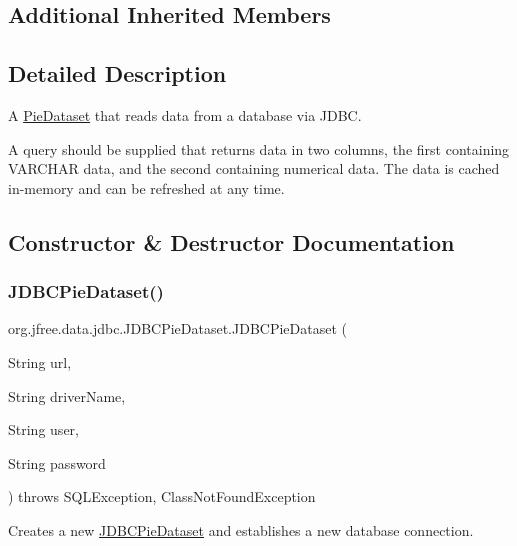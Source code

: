 \subsection*{Additional Inherited Members}


\subsection{Detailed Description}
A \mbox{\hyperlink{}{Pie\+Dataset}} that reads data from a database via J\+D\+BC. 

A query should be supplied that returns data in two columns, the first containing V\+A\+R\+C\+H\+AR data, and the second containing numerical data. The data is cached in-\/memory and can be refreshed at any time. 

\subsection{Constructor \& Destructor Documentation}
\mbox{\label{classorg_1_1jfree_1_1data_1_1jdbc_1_1_j_d_b_c_pie_dataset_a0723d757f5d580e1267f5fc0af370d84}} 
\subsubsection{\texorpdfstring{J\+D\+B\+C\+Pie\+Dataset()}{JDBCPieDataset()}\hspace{0.1cm}{\footnotesize\ttfamily [1/3]}}
{\footnotesize\ttfamily org.\+jfree.\+data.\+jdbc.\+J\+D\+B\+C\+Pie\+Dataset.\+J\+D\+B\+C\+Pie\+Dataset (\begin{DoxyParamCaption}\item[{String}]{url,  }\item[{String}]{driver\+Name,  }\item[{String}]{user,  }\item[{String}]{password }\end{DoxyParamCaption}) throws S\+Q\+L\+Exception, Class\+Not\+Found\+Exception}

Creates a new \mbox{\hyperlink{classorg_1_1jfree_1_1data_1_1jdbc_1_1_j_d_b_c_pie_dataset}{J\+D\+B\+C\+Pie\+Dataset}} and establishes a new database connection.


